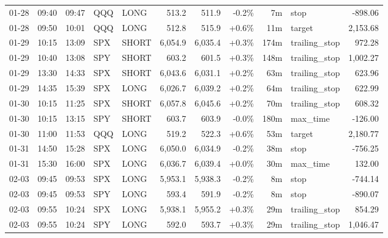 \documentclass[11pt,a4paper,twoside]{article}
\begin{document}
\begin{center}
\begin{longtable}{>{\color{txtmain}}l l l l l r r r r >{\color{txtmain}}l r}
01-28 & 09:40 & 09:47 & QQQ & LONG & 513.2 & 511.9 & \textcolor{lossred}{-0.2\%} & 7m & stop & \textcolor{lossred}{-898.06} \\
01-28 & 09:50 & 10:01 & QQQ & LONG & 512.8 & 515.9 & \textcolor{wingreen}{+0.6\%} & 11m & target & \textcolor{wingreen}{2,153.68} \\
01-29 & 10:15 & 13:09 & SPX & SHORT & 6,054.9 & 6,035.4 & \textcolor{wingreen}{+0.3\%} & 174m & trailing\_stop & \textcolor{wingreen}{972.28} \\
01-29 & 10:40 & 13:08 & SPY & SHORT & 603.2 & 601.5 & \textcolor{wingreen}{+0.3\%} & 148m & trailing\_stop & \textcolor{wingreen}{1,002.27} \\
01-29 & 13:30 & 14:33 & SPX & SHORT & 6,043.6 & 6,031.1 & \textcolor{wingreen}{+0.2\%} & 63m & trailing\_stop & \textcolor{wingreen}{623.96} \\
01-29 & 14:35 & 15:39 & SPX & LONG & 6,026.7 & 6,039.2 & \textcolor{wingreen}{+0.2\%} & 64m & trailing\_stop & \textcolor{wingreen}{622.99} \\
01-30 & 10:15 & 11:25 & SPX & SHORT & 6,057.8 & 6,045.6 & \textcolor{wingreen}{+0.2\%} & 70m & trailing\_stop & \textcolor{wingreen}{608.32} \\
01-30 & 10:15 & 13:15 & SPY & SHORT & 603.7 & 603.9 & \textcolor{lossred}{-0.0\%} & 180m & max\_time & \textcolor{lossred}{-126.00} \\
01-30 & 11:00 & 11:53 & QQQ & LONG & 519.2 & 522.3 & \textcolor{wingreen}{+0.6\%} & 53m & target & \textcolor{wingreen}{2,180.77} \\
01-31 & 14:50 & 15:28 & SPX & LONG & 6,050.0 & 6,034.9 & \textcolor{lossred}{-0.2\%} & 38m & stop & \textcolor{lossred}{-756.25} \\
01-31 & 15:30 & 16:00 & SPX & LONG & 6,036.7 & 6,039.4 & \textcolor{wingreen}{+0.0\%} & 30m & max\_time & \textcolor{wingreen}{132.00} \\
02-03 & 09:45 & 09:53 & SPX & LONG & 5,953.1 & 5,938.3 & \textcolor{lossred}{-0.2\%} & 8m & stop & \textcolor{lossred}{-744.14} \\
02-03 & 09:45 & 09:53 & SPY & LONG & 593.4 & 591.9 & \textcolor{lossred}{-0.2\%} & 8m & stop & \textcolor{lossred}{-890.07} \\
02-03 & 09:55 & 10:24 & SPX & LONG & 5,938.1 & 5,955.2 & \textcolor{wingreen}{+0.3\%} & 29m & trailing\_stop & \textcolor{wingreen}{854.29} \\
02-03 & 09:55 & 10:24 & SPY & LONG & 592.0 & 593.7 & \textcolor{wingreen}{+0.3\%} & 29m & trailing\_stop & \textcolor{wingreen}{1,046.47} \\

\end{longtable}
\end{center}
\end{document}
